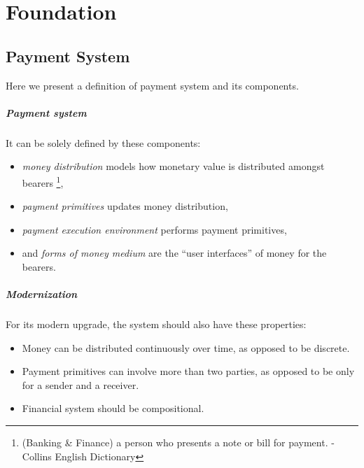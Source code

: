 \chapter{Foundation}

\section{Payment System}

Here we present a definition of payment system and its components.

\paragraph{Payment system}

It can be solely defined by these components:

\begin{itemize}
    \item \textit{money distribution} models how monetary value is distributed amongst
bearers \footnote{(Banking \& Finance) a person who presents a note or bill for payment. - Collins
English Dictionary},

    \item \textit{payment primitives} updates money distribution,

    \item \textit{payment execution environment} performs payment primitives,

    \item and \textit{forms of money medium} are the ``user interfaces'' of money for the bearers.
\end{itemize}

\paragraph{Modernization}

For its modern upgrade, the system should also have these properties:

\begin{itemize}
    \item Money can be distributed continuously over time, as opposed to be discrete.

    \item Payment primitives can involve more than two parties, as opposed to be only for a sender
and a receiver.

    \item Financial system should be compositional.
\end{itemize}

